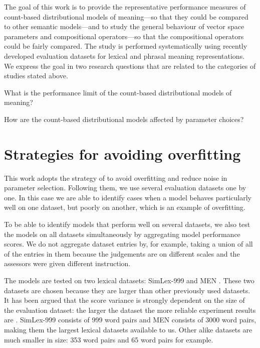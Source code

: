 The goal of this work is to provide the representative performance measures of count-based distributional models of meaning---so that they could be compared to other semantic models---and to study the general behaviour of vector space parameters and compositional operators---so that the compositional operators could be fairly compared. The study is performed systematically using recently developed evaluation datasets for lexical and phrasal meaning representations. We express the goal in two research questions that are related to the categories of studies stated above.
\begin{compactitem}
\item What is the performance limit of the count-based distributional models of meaning?
\item How are the count-based distributional models affected by parameter choices?
\end{compactitem}


\section{Strategies for avoiding overfitting}
\label{sec:avoiding-overfitting}

This work adopts the strategy of  to avoid overfitting and reduce noise in parameter selection. Following them, we use several evaluation datasets one by one. In this case we are able to identify cases when a model behaves particularly well on one dataset, but poorly on another, which is an example of overfitting.

To be able to identify models that perform well on several datasets, we also test the models on all datasets simultaneously by aggregating model performance scores. We do not aggregate dataset entries by, for example, taking a union of all of the entries in them because the judgements are on different scales and the assessors were given different instruction.

The models are tested on two lexical datasets: SimLex-999 \cite{hill2014simlex} and MEN \cite{Bruni:2014:MDS:2655713.2655714}. These two datasets are chosen because they are larger than other previously used datasets. It has been argued that the score variance is strongly dependent on the size of the evaluation dataset: the larger the dataset the more reliable experiment results are \cite{W16-2502}. SimLex-999 consists of 999 word pairs and MEN consists of 3000 word pairs, making them the largest lexical datasets available to us. Other alike datasets are much smaller in size: 353 word pairs \cite{2002:PSC:503104.503110} and 65 word pairs \cite{Rubenstein:1965:CCS:365628.365657} for example.
% 

